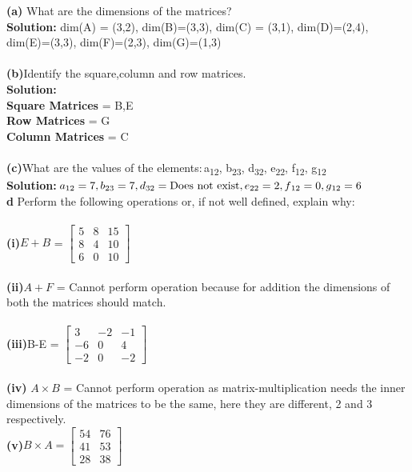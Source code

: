 \documentclass{article}
\begin{document}
\textbf{(a)} What are the dimensions of the matrices?\\
\textbf{Solution:} dim(A) = (3,2), dim(B)=(3,3), dim(C) = (3,1), dim(D)=(2,4), dim(E)=(3,3), dim(F)=(2,3), dim(G)=(1,3)\\ \\
\textbf{(b)}Identify the square,column and row matrices.\\
\textbf{Solution:} \\
\textbf{Square Matrices} = B,E\\
\textbf{Row Matrices} = G\\
\textbf{Column Matrices} = C\\ \\
\textbf{(c)}What are the values of the elements:\,a\textsubscript{12}, b\textsubscript{23}, d\textsubscript{32}, e\textsubscript{22}, f\textsubscript{12}, g\textsubscript{12}\\
\textbf{Solution:}$\,a\textsubscript{12} = 7, b\textsubscript{23}= 7, d\textsubscript{32} = \text{Does not exist}, e\textsubscript{22} =2, f\textsubscript{12} =0, g\textsubscript{12}=6$\\
\textbf{d} Perform the following operations or, if not well defined, explain why:\\ \\
\textbf{(i)}$ E+B$ = $\left[
\begin{matrix}
5&8&15\\
8&4&10\\
6&0&10
\end{matrix}
\right]$\\ \\
\textbf{(ii)}$A+F$ = Cannot perform operation because for addition the dimensions of both the matrices should match.\\ \\
\textbf{(iii)}B-E = $\left[
\begin{matrix}
3&-2&-1\\
-6&0&4\\
-2&0&-2
\end{matrix}
\right]$ \\ \\


\textbf{(iv)} $A\times B$ = Cannot perform operation as matrix-multiplication needs the inner dimensions of the matrices to be the same, here they are different, 2 and 3 respectively.\\


\textbf{(v)}$B\times A = \left[
\begin{matrix}
54&76\\
41&53\\
28&38
\end{matrix}
\right]$ \\ \\ \\
\end{document}
